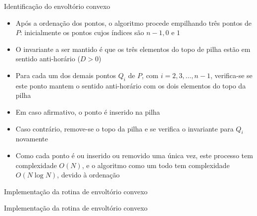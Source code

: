 \begin{frame}[fragile]{Identificação do envoltório convexo}

    \begin{itemize}
        \item Após a ordenação dos pontos, o algoritmo procede empilhando
            três pontos de $P$: inicialmente os pontos cujos índices são $n - 1, 0$ e $1$
        \pause

        \item  O invariante a ser mantido é que os três elementos do topo de pilha estão em 
            sentido anti-horário ($D > 0$)
        \pause

        \item Para cada um dos demais pontos $Q_i$ de $P$, com $i = 2, 3, \ldots, n - 1$, 
            verifica-se se este ponto mantem o sentido anti-horário com os dois elementos do topo 
            da pilha
        \pause

        \item Em caso afirmativo, o ponto é inserido na pilha 
        \pause

        \item Caso contrário, remove-se o topo da pilha e se verifica o invariante para
            $Q_i$ novamente
        \pause

        \item Como cada ponto é ou inserido ou removido uma única vez, este processo tem 
            complexidade $O(N)$, e o algoritmo como um todo tem complexidade $O(N\log N)$, 
            devido à ordenação
    \end{itemize}

\end{frame}



\begin{frame}[fragile]{Implementação da rotina de envoltório convexo}
\end{frame}

\begin{frame}[fragile]{Implementação da rotina de envoltório convexo}
\end{frame}
